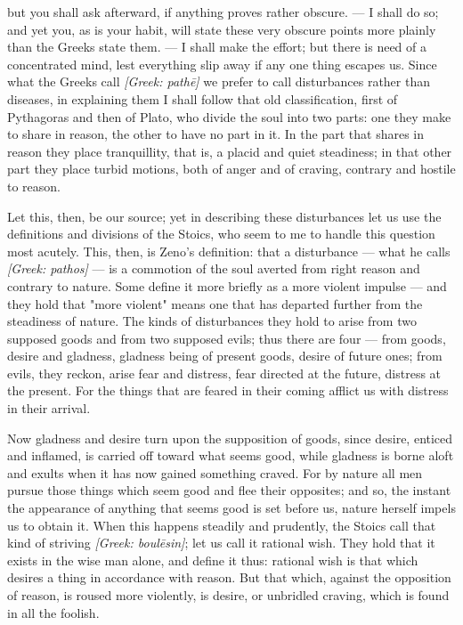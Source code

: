 but you shall ask afterward, if anything proves rather obscure. — I shall do so; and yet you, as is your habit, will state these very obscure points more plainly than the Greeks state them. — I shall make the effort; but there is need of a concentrated mind, lest everything slip away if any one thing escapes us. Since what the Greeks call \textit{[Greek: pathē]} we prefer to call disturbances rather than diseases, in explaining them I shall follow that old classification, first of Pythagoras and then of Plato, who divide the soul into two parts: one they make to share in reason, the other to have no part in it. In the part that shares in reason they place tranquillity, that is, a placid and quiet steadiness; in that other part they place turbid motions, both of anger and of craving, contrary and hostile to reason.

 Let this, then, be our source; yet in describing these disturbances let us use the definitions and divisions of the Stoics, who seem to me to handle this question most acutely. This, then, is Zeno's definition: that a disturbance — what he calls \textit{[Greek: pathos]} — is a commotion of the soul averted from right reason and contrary to nature. Some define it more briefly as a more violent impulse — and they hold that "more violent" means one that has departed further from the steadiness of nature. The kinds of disturbances they hold to arise from two supposed goods and from two supposed evils; thus there are four — from goods, desire and gladness, gladness being of present goods, desire of future ones; from evils, they reckon, arise fear and distress, fear directed at the future, distress at the present. For the things that are feared in their coming afflict us with distress in their arrival.

 Now gladness and desire turn upon the supposition of goods, since desire, enticed and inflamed, is carried off toward what seems good, while gladness is borne aloft and exults when it has now gained something craved. For by nature all men pursue those things which seem good and flee their opposites; and so, the instant the appearance of anything that seems good is set before us, nature herself impels us to obtain it. When this happens steadily and prudently, the Stoics call that kind of striving \textit{[Greek: boulēsin]}; let us call it rational wish. They hold that it exists in the wise man alone, and define it thus: rational wish is that which desires a thing in accordance with reason. But that which, against the opposition of reason, is roused more violently, is desire, or unbridled craving, which is found in all the foolish.

